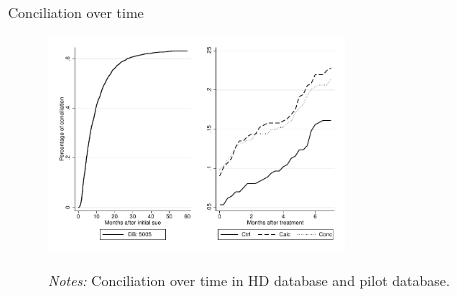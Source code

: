 \documentclass[9pt]{beamer}
\begin{document}
\begin{frame}{Conciliation over time}
    \begin{figure}[H]
    \label{Figure_dynamicsConciliation}
    \begin{center}
        \includegraphics[width=0.7\textwidth]{con_overtime.pdf}
        \end{center}
        {\footnotesize \textit{Notes: } Conciliation over time in HD database and pilot database.}
\end{figure}
\end{frame}
\end{document}

